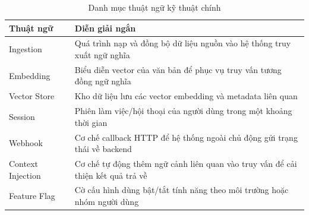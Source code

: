 \begin{table}[H]
\centering
\renewcommand{\arraystretch}{1.2}
\small
\begin{tabular}{|p{3.2cm}|p{10.8cm}|}
\hline
\textbf{Thuật ngữ} & \textbf{Diễn giải ngắn} \\
\hline
Ingestion & Quá trình nạp và đồng bộ dữ liệu nguồn vào hệ thống truy xuất ngữ nghĩa \\
\hline
Embedding & Biểu diễn vector của văn bản để phục vụ truy vấn tương đồng ngữ nghĩa \\
\hline
Vector Store & Kho dữ liệu lưu các vector embedding và metadata liên quan \\
\hline
Session & Phiên làm việc/hội thoại của người dùng trong một khoảng thời gian \\
\hline
Webhook & Cơ chế callback HTTP để hệ thống ngoài chủ động gửi trạng thái về backend \\
\hline
Context Injection & Cơ chế tự động thêm ngữ cảnh liên quan vào truy vấn để cải thiện kết quả trả về \\
\hline
Feature Flag & Cờ cấu hình dùng bật/tắt tính năng theo môi trường hoặc nhóm người dùng \\
\hline
\end{tabular}
\caption{Danh mục thuật ngữ kỹ thuật chính}
\end{table}

\clearpage